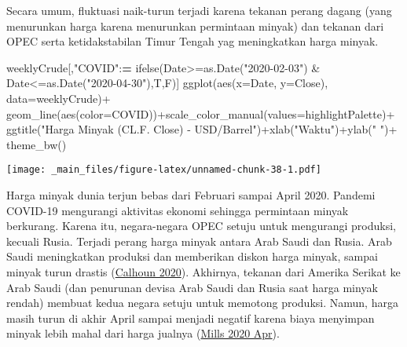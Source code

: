 \documentclass[
]{book}
\newenvironment{Shaded}{\begin{snugshade}}{\end{snugshade}}
\newcommand{\AttributeTok}[1]{\textcolor[rgb]{0.77,0.63,0.00}{#1}}
\newcommand{\ErrorTok}[1]{\textcolor[rgb]{0.64,0.00,0.00}{\textbf{#1}}}
\newcommand{\FunctionTok}[1]{\textcolor[rgb]{0.00,0.00,0.00}{#1}}
\newcommand{\NormalTok}[1]{#1}
\newcommand{\SpecialCharTok}[1]{\textcolor[rgb]{0.00,0.00,0.00}{#1}}
\newcommand{\StringTok}[1]{\textcolor[rgb]{0.31,0.60,0.02}{#1}}
\begin{document}
Secara umum, fluktuasi naik-turun terjadi karena tekanan perang dagang (yang menurunkan harga karena menurunkan permintaan minyak) dan tekanan dari OPEC serta ketidakstabilan Timur Tengah yag meningkatkan harga minyak.

\begin{Shaded}
\begin{Highlighting}[]
\NormalTok{weeklyCrude[,}\StringTok{"COVID"}\SpecialCharTok{:}\ErrorTok{=}
              \FunctionTok{ifelse}\NormalTok{(Date}\SpecialCharTok{\textgreater{}=}\FunctionTok{as.Date}\NormalTok{(}\StringTok{"2020{-}02{-}03"}\NormalTok{) }\SpecialCharTok{\&}\NormalTok{ Date}\SpecialCharTok{\textless{}=}\FunctionTok{as.Date}\NormalTok{(}\StringTok{"2020{-}04{-}30"}\NormalTok{),T,F)]}
\FunctionTok{ggplot}\NormalTok{(}\FunctionTok{aes}\NormalTok{(}\AttributeTok{x=}\NormalTok{Date, }\AttributeTok{y=}\NormalTok{Close),}
       \AttributeTok{data=}\NormalTok{weeklyCrude)}\SpecialCharTok{+}
  \FunctionTok{geom\_line}\NormalTok{(}\FunctionTok{aes}\NormalTok{(}\AttributeTok{color=}\StringTok{\textasciigrave{}}\AttributeTok{COVID}\StringTok{\textasciigrave{}}\NormalTok{))}\SpecialCharTok{+}\FunctionTok{scale\_color\_manual}\NormalTok{(}\AttributeTok{values=}\NormalTok{highlightPalette)}\SpecialCharTok{+}
  \FunctionTok{ggtitle}\NormalTok{(}\StringTok{"Harga Minyak (CL.F. Close) {-} USD/Barrel"}\NormalTok{)}\SpecialCharTok{+}\FunctionTok{xlab}\NormalTok{(}\StringTok{"Waktu"}\NormalTok{)}\SpecialCharTok{+}\FunctionTok{ylab}\NormalTok{(}\StringTok{" "}\NormalTok{)}\SpecialCharTok{+}
  \FunctionTok{theme\_bw}\NormalTok{()}
\end{Highlighting}
\end{Shaded}

\texttt{[image: \_main\_files/figure-latex/unnamed-chunk-38-1.pdf]}

Harga minyak dunia terjun bebas dari Februari sampai April 2020. Pandemi COVID-19 mengurangi aktivitas ekonomi sehingga permintaan minyak berkurang. Karena itu, negara-negara OPEC setuju untuk mengurangi produksi, kecuali Rusia. Terjadi perang harga minyak antara Arab Saudi dan Rusia. Arab Saudi meningkatkan produksi dan memberikan diskon harga minyak, sampai minyak turun drastis (\protect\hyperlink{ref-calhoun_saudirussia_nodate}{Calhoun 2020}). Akhirnya, tekanan dari Amerika Serikat ke Arab Saudi (dan penurunan devisa Arab Saudi dan Rusia saat harga minyak rendah) membuat kedua negara setuju untuk memotong produksi. Namun, harga masih turun di akhir April sampai menjadi negatif karena biaya menyimpan minyak lebih mahal dari harga jualnya (\protect\hyperlink{ref-lw_oil_2020}{Mills 2020 Apr}).
\end{document}
